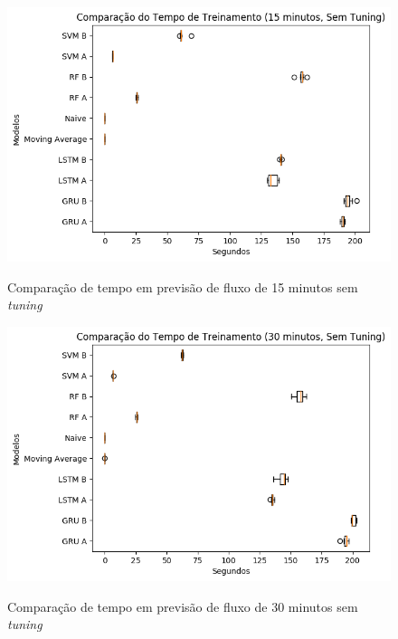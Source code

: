 \begin{figure}[htbp]
    \centering
    \includegraphics[scale=0.8]{monography/img/snapshots/comparacao_do_tempo_de_treinamento_(15_minutos,_sem_tuning)_performance_boxes.png}
    \label{figure:comparacao_previsao_tempo_15_sem_tuning}
    \caption{Comparação de tempo em previsão de fluxo de 15 minutos sem \textit{tuning}}
\end{figure}

\begin{figure}[htbp]
    \centering
    \includegraphics[scale=0.8]{monography/img/snapshots/comparacao_do_tempo_de_treinamento_(30_minutos,_sem_tuning)_performance_boxes.png}
    \label{figure:comparacao_previsao_tempo_30_sem_tuning}
    \caption{Comparação de tempo em previsão de fluxo de 30 minutos sem \textit{tuning}}
\end{figure}


